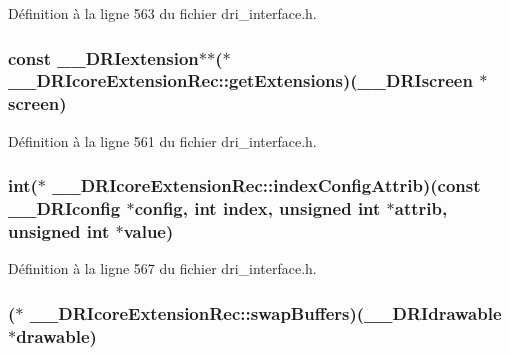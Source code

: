 Définition à la ligne 563 du fichier dri\-\_\-interface.\-h.

\hypertarget{struct_____d_r_icore_extension_rec_adb2a7440735042ebec39fc388c5ccf8e}{
\subsubsection[{get\-Extensions}]{\setlength{\rightskip}{0pt plus 5cm}const {\bf \-\_\-\-\_\-\-D\-R\-Iextension}$\ast$$\ast$($\ast$ \-\_\-\-\_\-\-D\-R\-Icore\-Extension\-Rec\-::get\-Extensions)({\bf \-\_\-\-\_\-\-D\-R\-Iscreen} $\ast$screen)}}\label{struct_____d_r_icore_extension_rec_adb2a7440735042ebec39fc388c5ccf8e}


Définition à la ligne 561 du fichier dri\-\_\-interface.\-h.

\hypertarget{struct_____d_r_icore_extension_rec_a400d591a81525ef10d04b98d93f59ae6}{
\subsubsection[{index\-Config\-Attrib}]{\setlength{\rightskip}{0pt plus 5cm}int($\ast$ \-\_\-\-\_\-\-D\-R\-Icore\-Extension\-Rec\-::index\-Config\-Attrib)(const {\bf \-\_\-\-\_\-\-D\-R\-Iconfig} $\ast$config, int {\bf index}, unsigned int $\ast$attrib, unsigned int $\ast${\bf value})}}\label{struct_____d_r_icore_extension_rec_a400d591a81525ef10d04b98d93f59ae6}


Définition à la ligne 567 du fichier dri\-\_\-interface.\-h.

\hypertarget{struct_____d_r_icore_extension_rec_ae87dc970a4508935533c226d2cc38830}{
\subsubsection[{swap\-Buffers}]{($\ast$ \-\_\-\-\_\-\-D\-R\-Icore\-Extension\-Rec\-::swap\-Buffers)({\bf \-\_\-\-\_\-\-D\-R\-Idrawable} $\ast$drawable)}}\label{struct_____d_r_icore_extension_rec_ae87dc970a4508935533c226d2cc38830}


